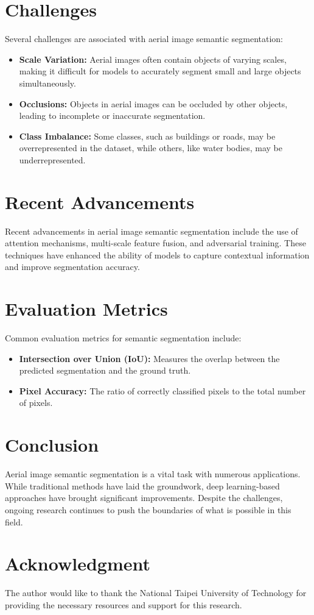 \documentclass[conference]{IEEEtran}
\begin{document}
\section{Challenges}
Several challenges are associated with aerial image semantic segmentation:
\begin{itemize}
    \item \textbf{Scale Variation:} Aerial images often contain objects of varying scales, making it difficult for models to accurately segment small and large objects simultaneously.
    \item \textbf{Occlusions:} Objects in aerial images can be occluded by other objects, leading to incomplete or inaccurate segmentation.
    \item \textbf{Class Imbalance:} Some classes, such as buildings or roads, may be overrepresented in the dataset, while others, like water bodies, may be underrepresented.
\end{itemize}

\section{Recent Advancements}
Recent advancements in aerial image semantic segmentation include the use of attention mechanisms, multi-scale feature fusion, and adversarial training. These techniques have enhanced the ability of models to capture contextual information and improve segmentation accuracy.

\section{Evaluation Metrics}
Common evaluation metrics for semantic segmentation include:
\begin{itemize}
    \item \textbf{Intersection over Union (IoU):} Measures the overlap between the predicted segmentation and the ground truth.
    \item \textbf{Pixel Accuracy:} The ratio of correctly classified pixels to the total number of pixels.
\end{itemize}

\section{Conclusion}
Aerial image semantic segmentation is a vital task with numerous applications. While traditional methods have laid the groundwork, deep learning-based approaches have brought significant improvements. Despite the challenges, ongoing research continues to push the boundaries of what is possible in this field.

\section*{Acknowledgment}
The author would like to thank the National Taipei University of Technology for providing the necessary resources and support for this research.



\end{document}
